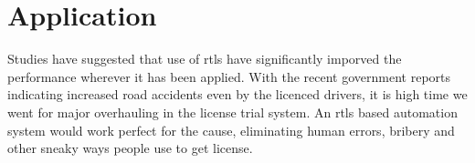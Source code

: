 \section{Application}
Studies have suggested that use of \gls{rtls} have significantly imporved\cite{Improvement} the performance wherever it has been applied. With the recent government reports indicating increased road accidents even by the licenced drivers, it is high time we went for major overhauling in the license trial system. An \gls{rtls} based automation system would work perfect for the cause, eliminating human errors, bribery and other sneaky ways people use to get license.


